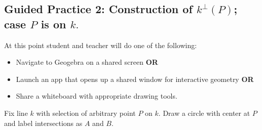 \documentclass{tufte-handout}
\newcommand{\uvx}{\vspace{.2in}}
\begin{document}
\pagebreak

\begin{tcolorbox}[enhanced jigsaw,breakable,pad at break*=1mm,attach boxed title to top center={yshift=-3mm,yshifttext=-1mm},
  colback=yellow!50!white,colframe=yellow,colbacktitle=red!80!black,
  title=Lesson Design Specifications (Please Read),fonttitle=\bfseries,
  boxed title style={size=small,colframe=red!50!black} ]
  \section{Guided Practice 2: Construction of $k^{\perp}(P)$; case $P$ is on $k.$ }
 At this point student and teacher will do one of the following: 
    \begin{itemize}
      \item Navigate to Geogebra on a shared screen \textbf{OR}
      \item Launch an app that opens up a shared window for interactive geometry \textbf{OR}
      \item Share a whiteboard with appropriate drawing tools.
  \end{itemize}
  
  \uvx
  
  \begin{minipage}{0.65\textwidth}
\end{minipage} \hfill
\begin{minipage}{0.32\textwidth}
\begin{scriptsize}
 Fix line $k$ with selection of arbitrary point $P$ on $k.$
 Draw a circle with center at $P$ and label intersections as $A$ and $B.$
 \end{scriptsize}
\end{minipage}


\end{tcolorbox}
\end{document}
